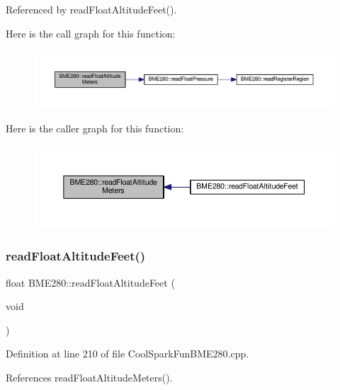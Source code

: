 Referenced by read\+Float\+Altitude\+Feet().

Here is the call graph for this function\+:\nopagebreak
\begin{figure}[H]
\begin{center}
\leavevmode
\includegraphics[width=350pt]{df/dcf/class_b_m_e280_af67b56ba50760ee1d116acc6c5010221_cgraph}
\end{center}
\end{figure}
Here is the caller graph for this function\+:\nopagebreak
\begin{figure}[H]
\begin{center}
\leavevmode
\includegraphics[width=350pt]{df/dcf/class_b_m_e280_af67b56ba50760ee1d116acc6c5010221_icgraph}
\end{center}
\end{figure}
\mbox{\label{class_b_m_e280_a6525c8a26f887b52596c86bed99343cb}} 
\subsubsection{\texorpdfstring{read\+Float\+Altitude\+Feet()}{readFloatAltitudeFeet()}}
{\footnotesize\ttfamily float B\+M\+E280\+::read\+Float\+Altitude\+Feet (\begin{DoxyParamCaption}\item[{void}]{ }\end{DoxyParamCaption})}



Definition at line 210 of file Cool\+Spark\+Fun\+B\+M\+E280.\+cpp.



References read\+Float\+Altitude\+Meters().

